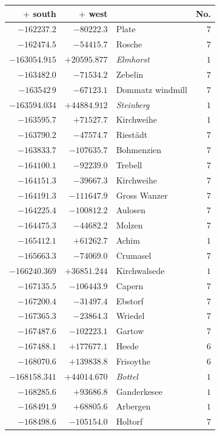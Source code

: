 \clearpage{}%
\begin{center}\begingroup\fontsize{8}{9}\selectfont
\setlength{\tabcolsep}{4pt}
\begin{tabular}{r|r|p{170pt}|r}\hline
\(+\) south&\(+\) west&&No.\\\hline
\(-162237.2\)&\(-80222.3\)&Plate&\(7\)\\
\(-162474.5\)&\(-54415.7\)&Rosche&\(7\)\\
\(-163054.915\)&\(+20595.877\)&\textit{Elmhorst}&\(1\)\\
\(-163482.0\)&\(-71534.2\)&Zebelin&\(7\)\\
\(-163542\,9\)&\(-67123.1\)&Dommatz windmill&\(7\)\\
\(-163594.034\)&\(+44884.912\)&\textit{Steinberg}&\(1\)\\
\(-163595.7\)&\(+71527.7\)&Kirchweihe&\(1\)\\
\(-163790.2\)&\(-47574.7\)&Riestädt&\(7\)\\
\(-163833.7\)&\(-107635.7\)&Bohmenzien&\(7\)\\
\(-164100.1\)&\(-92239.0\)&Trebell&\(7\)\\
\(-164151.3\)&\(-39667.3\)&Kirchweihe&\(7\)\\
\(-164191.3\)&\(-111647.9\)&Gross Wanzer&\(7\)\\
\(-164225.4\)&\(-100812.2\)&Aulosen&\(7\)\\
\(-164475.3\)&\(-44682.2\)&Molzen&\(7\)\\
\(-165412.1\)&\(+61262.7\)&Achim&\(1\)\\
\(-165663.3\)&\(-74069.0\)&Crumasel&\(7\)\\
\(-166240.369\)&\(+36851.244\)&Kirchwalsede&\(1\)\\
\(-167135.5\)&\(-106443.9\)&Capern&\(7\)\\
\(-167200.4\)&\(-31497.4\)&Ebstorf&\(7\)\\
\(-167365.3\)&\(-23864.3\)&Wriedel&\(7\)\\
\(-167487.6\)&\(-102223.1\)&Gartow&\(7\)\\
\(-167488.1\)&\(+177677.1\)&Heede&\(6\)\\
\(-168070.6\)&\(+139838.8\)&Frisoythe&\(6\)\\
\(-168158.341\)&\(+44014.670\)&\textit{Bottel}&\(1\)\\
\(-168285.6\)&\(+93686.8\)&Ganderkesee&\(1\)\\
\(-168491.9\)&\(+68805.6\)&Arbergen&\(1\)\\
\(-168498.6\)&\(-105154.0\)&Holtorf&\(7\)\\

\end{tabular}
\end{center}
